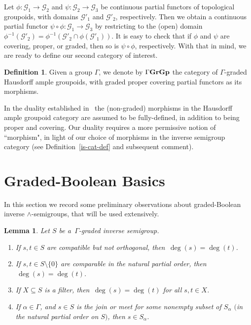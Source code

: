 \documentclass[a4paper,reqno,12pt]{amsart}
\numberwithin{equation}{section}
\theoremstyle{plain}
\newtheorem{lemma}[thm]{Lemma}
\theoremstyle{definition}
\newtheorem{deff}[thm]{Definition}
\newcommand{\GG}{\operatorname{\Gamma\bf{GrGp}}}
\begin{document}
Let $\phi : \mathscr{G}_1 \to \mathscr{G}_2$ and $\psi : \mathscr{G}_2 \to \mathscr{G}_3$ be continuous partial functors of topological groupoids, with domains $\mathscr{G}'_1$ and $\mathscr{G}'_2$, respectively. Then we obtain a continuous partial functor $\psi \circ \phi : \mathscr{G}_1 \to \mathscr{G}_3$ by restricting to the (open) domain $\phi^{-1}(\mathscr{G}'_2) = \phi^{-1}(\mathscr{G}'_2 \cap \phi(\mathscr{G}'_1))$. It is easy to check that if $\phi$ and $\psi$ are covering, proper, or graded, then so is $\psi \circ \phi$, respectively. With that in mind, we are ready to define our second category of interest.

\begin{deff} \label{gp-cat-def}
Given a group $\Gamma$, we denote by $\GG$ the category of $\Gamma$-graded Hausdorff ample groupoids, with graded proper covering partial functors as its morphisms.
\end{deff}

In the duality established in~\cite{Lawson2, Lawson3} the (non-graded) morphisms in the Hausdorff ample groupoid category are assumed to be fully-defined, in addition to being proper and covering. Our duality requires a more permissive notion of ``morphism", in light of our choice of morphisms in the inverse semigroup category (see Definition~\ref{is-cat-def} and subsequent comment).

\section{Graded-Boolean Basics}\label{basics-sect}

In this section we record some preliminary observations about graded-Boolean inverse $\land$-semigroups, that will be used extensively.

\begin{lemma} \label{filter-lemma}
Let $S$ be a $\, \Gamma$-graded inverse semigroup.
\begin{enumerate}[\upshape(1)]
\item If $s,t \in S$ are compatible but not orthogonal, then $\, \deg(s)=\deg(t)$.

\smallskip 

\item If $s,t \in S \setminus \{0\}$ are comparable in the natural partial order, then $\, \deg(s)=\deg(t)$.

\smallskip 

\item If $X \subseteq S$ is a filter, then $\, \deg(s)=\deg(t)$ for all $s, t\in X$.

\smallskip

\item If $\alpha \in \Gamma$, and $s \in S$ is the join or meet for some nonempty subset of $S_{\alpha}$ $($in the natural partial order on $S$$)$, then $s \in S_{\alpha}$. 
\end{enumerate}
\end{lemma}
\end{document}
